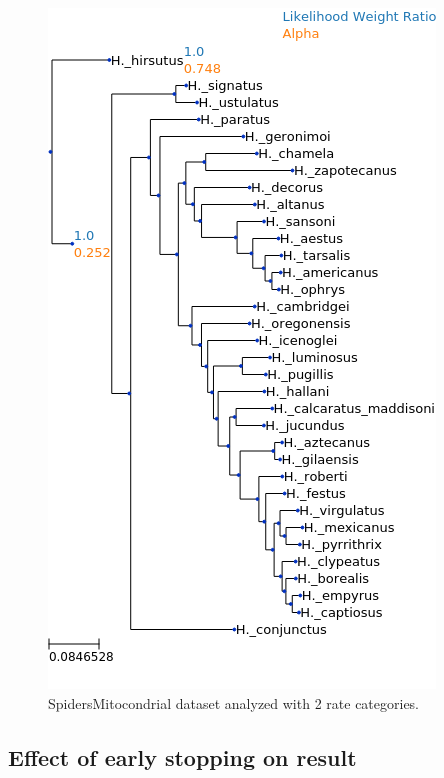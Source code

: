 \documentclass{article}
\begin{document}
\begin{figure}
  \begin{center}
    \includegraphics[width=.75\linewidth]{figs/spiders/2rate.png}
    \caption{SpidersMitocondrial dataset analyzed with 2 rate categories.}
    \label{fig:spiders2rate}
  \end{center}
\end{figure}

\subsection{Effect of early stopping on result}
\end{document}
